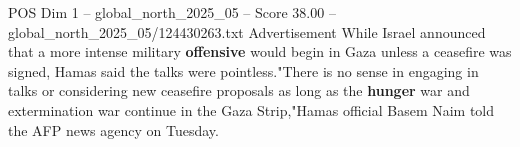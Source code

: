 \begin{textsample}{POS Dim 1 – global\_north\_2025\_05 – Score 38.00 – global\_north\_2025\_05/124430263.txt}
Advertisement While Israel announced that a more intense military \textbf{offensive} would begin in Gaza unless a ceasefire was signed, Hamas said the talks were pointless."There is no sense in engaging in talks or considering new ceasefire proposals as long as the \textbf{hunger} war and extermination war continue in the Gaza Strip,"Hamas official Basem Naim told the AFP news agency on Tuesday.

\end{textsample}
